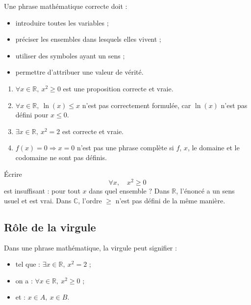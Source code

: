 \documentclass[11pt,a4paper]{article}
\newcommand{\R}{\mathbb{R}}
\newcommand{\C}{\mathbb{C}}
\newcommand{\imp}{\Rightarrow}
\begin{document}
\begin{definitionbox}
Une phrase mathématique correcte doit :
\begin{itemize}
    \item introduire toutes les variables ;
    \item préciser les ensembles dans lesquels elles vivent ;
    \item utiliser des symboles ayant un sens ;
    \item permettre d'attribuer une valeur de vérité.
\end{itemize}
\end{definitionbox}

\begin{exemplebox}
\begin{enumerate}
    \item \(\forall x\in\R,\ x^2\geq0\) est une proposition correcte et vraie.
    \item \(\forall x\in\R,\ \ln(x)\leq x\) n'est pas correctement formulée, car \(\ln(x)\) n'est pas défini pour \(x\leq0\).
    \item \(\exists x\in\R,\ x^2=2\) est correcte et vraie.
    \item \(f(x)=0\imp x=0\) n'est pas une phrase complète si \(f\), \(x\), le domaine et le codomaine ne sont pas définis.
\end{enumerate}
\end{exemplebox}

\begin{piegebox}
Écrire
\[
\forall x,\quad x^2\geq0
\]
est insuffisant : pour tout \(x\) dans quel ensemble ? Dans \(\R\), l'énoncé a un sens usuel et est vrai. Dans \(\C\), l'ordre \(\geq\) n'est pas défini de la même manière.
\end{piegebox}

\subsection{Rôle de la virgule}

\begin{definitionbox}
Dans une phrase mathématique, la virgule peut signifier :
\begin{itemize}
    \item \og tel que \fg{} : \(\exists x\in\R,\ x^2=2\) ;
    \item \og on a \fg{} : \(\forall x\in\R,\ x^2\geq0\) ;
    \item \og et \fg{} : \(x\in A,\ x\in B\).
\end{itemize}
\end{definitionbox}
\end{document}
